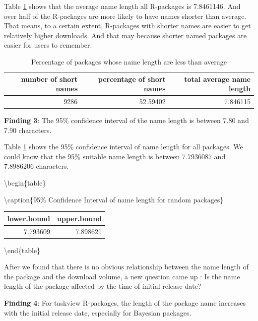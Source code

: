 \documentclass[
]{book}
\newenvironment{discovery}[1]{%
  \begin{tcolorbox}[colback=blue!30,colframe=blue!80!black]#1}{\end{tcolorbox}}
\begin{document}
Table \ref{tab:pct-lngname} shows that the average name length all R-packages is 7.8461146. And over half of the R-packages are more likely to have names shorter than average. That means, to a certain extent, R-packages with shorter names are easier to get relatively higher downloads. And that may because shorter named packages are easier for users to remember.

\begin{table}

\caption{\label{tab:pct-lngname}Percentage of packages whose name length are less than average}
\centering
\begin{tabular}[t]{r|r|r}
\hline
number of short names & percentage of short names & total average name length\\
\hline
9286 & 52.59402 & 7.846115\\
\hline
\end{tabular}
\end{table}

\begin{discovery}
\textbf{Finding 3}: The 95\% confidence interval of the name length is
between 7.80 and 7.90 characters.
\end{discovery}

Table \ref{tab:pct-lngname} shows the 95\% confidence interval of name length for all packages. We could know that the 95\% suitable name length is between 7.7936087 and 7.8986206 characters.

\textbackslash begin\{table\}

\textbackslash caption\{\label{tab:namelth-ci}95\% Confidence Interval of name length for random packages\}
\centering

\begin{tabular}[t]{r|r}
\hline
lower.bound & upper.bound\\
\hline
7.793609 & 7.898621\\
\hline
\end{tabular}

\textbackslash end\{table\}

After we found that there is no obvious relationship between the name length of the package and the download volume, a new question came up : Is the name length of the package affected by the time of initial release date?

\begin{discovery}
\textbf{Finding 4}: For taskview R-packages, the length of the package
name increases with the initial release date, especially for Bayesian
packages.
\end{discovery}
\end{document}
